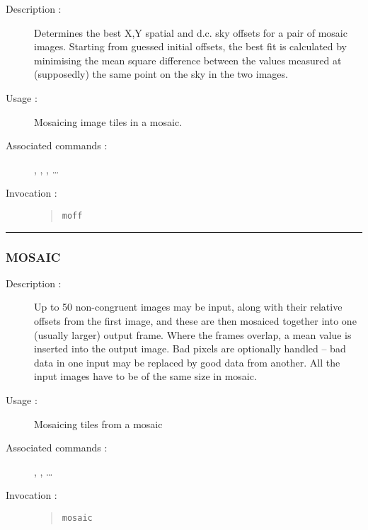 \begin{description}

\item[Description :] Determines the best X,Y spatial and
d.c. sky offsets for a pair of mosaic images.  Starting from guessed
initial offsets, the best fit is calculated by minimising the mean
square difference between the values measured at (supposedly) the same
point on the sky in the two images.

\item[Usage :] Mosaicing image tiles in a mosaic.

\item[Associated commands :] {\tt {}},
{\tt {}}, {\tt {}},
{\tt {}} \ldots

\item[Invocation :]

\begin{quote}{\tt  moff }\end{quote}

\end{description}

\hrule
\subsubsection*{\label{MOSAIC}MOSAIC}

\begin{description}

\item[Description :] Up to 50 non-congruent images may be input, along
with their relative offsets from the first image, and these are then
mosaiced together into one (usually larger) output frame. Where the
frames overlap, a mean value is inserted into the output image. Bad
pixels are optionally handled -- bad data in one input may be replaced
by good data from another.  All the input images have to be of the same
size in mosaic.

\item[Usage :] Mosaicing tiles from a mosaic

\item[Associated commands :] {\tt {}},
{\tt {}}, {\tt {}} \ldots

\item[Invocation :]

\begin{quote}{\tt  mosaic }\end{quote}

\end{description}

